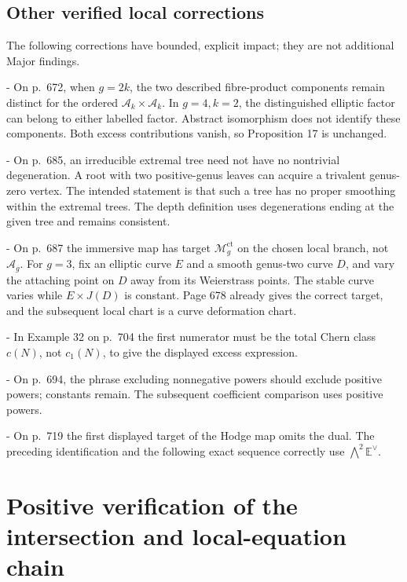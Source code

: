 \documentclass[10pt]{article}
\begin{document}
\subsection*{Other verified local corrections}
The following corrections have bounded, explicit impact; they are not additional Major findings.\par
- On p. 672, when \(g=2k\), the two described fibre-product components remain distinct for the ordered \(\mathcal A_k\times\mathcal A_k\). In \(g=4,k=2\), the distinguished elliptic factor can belong to either labelled factor. Abstract isomorphism does not identify these components. Both excess contributions vanish, so Proposition 17 is unchanged.\par
- On p. 685, an irreducible extremal tree need not have no nontrivial degeneration. A root with two positive-genus leaves can acquire a trivalent genus-zero vertex. The intended statement is that such a tree has no proper smoothing within the extremal trees. The depth definition uses degenerations ending at the given tree and remains consistent.\par
- On p. 687 the immersive map has target \(\mathcal M_g^\mathrm{ct}\) on the chosen local branch, not \(\mathcal A_g\). For \(g=3\), fix an elliptic curve \(E\) and a smooth genus-two curve \(D\), and vary the attaching point on \(D\) away from its Weierstrass points. The stable curve varies while \(E\times J(D)\) is constant. Page 678 already gives the correct target, and the subsequent local chart is a curve deformation chart.\par
- In Example 32 on p. 704 the first numerator must be the total Chern class \(c(N)\), not \(c_1(N)\), to give the displayed excess expression.\par
- On p. 694, the phrase excluding nonnegative powers should exclude positive powers; constants remain. The subsequent coefficient comparison uses positive powers.\par
- On p. 719 the first displayed target of the Hodge map omits the dual. The preceding identification and the following exact sequence correctly use \(\bigwedge^2\mathbb E^\vee\).\par
\section*{Positive verification of the intersection and local-equation chain}
\end{document}

